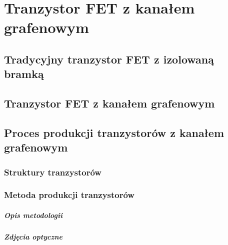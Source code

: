 \chapter{Tranzystor FET z kanałem grafenowym}
	\section{Tradycyjny tranzystor FET z izolowaną bramką}
	\section{Tranzystor FET z kanałem grafenowym}
	\section{Proces produkcji tranzystorów z kanałem grafenowym}
		\subsection{Struktury tranzystorów}
		\subsection{Metoda produkcji tranzystorów}
			\paragraph{Opis metodologii}
			\paragraph{Zdjęcia optyczne}
